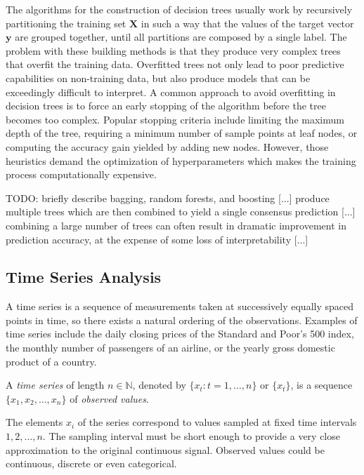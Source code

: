 The algorithms for the construction of decision trees usually work by recursively partitioning the training set $\mathbf{X}$ in such a way that the values of the target vector $\textbf{y}$ are grouped together, until all partitions are composed by a single label. The problem with these building methods is that they produce very complex trees that overfit the training data. Overfitted trees not only lead to poor predictive capabilities on non-training data, but also produce models that can be exceedingly difficult to interpret. A common approach to avoid overfitting in decision trees is to force an early stopping of the algorithm before the tree becomes too complex. Popular stopping criteria include limiting the maximum depth of the tree, requiring a minimum number of sample points at leaf nodes, or computing the accuracy gain yielded by adding new nodes. However, those heuristics demand the optimization of hyperparameters which makes the training process computationally expensive.

    {\color{red} TODO: briefly describe bagging, random forests, and boosting [...] produce multiple trees which are then combined to yield a single consensus prediction [...] combining a large number of trees can often result in dramatic improvement in prediction accuracy, at the expense of some loss of interpretability [...]}


\subsection{Time Series Analysis}
\label{sec:intro_time_series}

A time series is a sequence of measurements taken at successively equally spaced points in time, so there exists a natural ordering of the observations. Examples of time series include the daily closing prices of the Standard and Poor's 500 index, the monthly number of passengers of an airline, or the yearly gross domestic product of a country.

\begin{definition}
A \emph{time series} of length $n \in \mathbb{N}$, denoted by $\{ x_t : t=1, \ldots, n \}$ or $\{ x_t \}$, is a sequence $\{ x_1, x_2, \ldots, x_n \}$ of \emph{observed values}.
\end{definition}

The elements $x_i$ of the series correspond to values sampled at fixed time intervals $1, 2, \ldots, n$. The sampling interval must be short enough to provide a very close approximation to the original continuous signal. Observed values could be continuous, discrete or even categorical.


